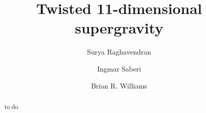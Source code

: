 \documentclass[11pt]{amsart}
\begin{document}
\title{Twisted 11-dimensional supergravity}
\author{Surya Raghavendran}
\address{Perimeter Institute for Theoretical Physics \\ 31 Caroline Street North \\ 
Waterloo, Ontario N2L 2Y5\\ Canada}
\author{Ingmar Saberi}
\address{Ludwig-Maximilians-Universit\"at M\"unchen \\ Fakult\"at f\"ur Physik \\ Theresienstra\ss{}e 37 \\ 80333 M\"unchen \\ Deutschland}
\author{Brian R. Williams}
\address{School of Mathematics \\ University of Edinburgh \\ Edinburgh EH9 3FD \\ Scotland}
\begin{abstract}
to do
\end{abstract}
\maketitle

\tableofcontents

\newpage 

 











%



\printbibliography
\end{document}
